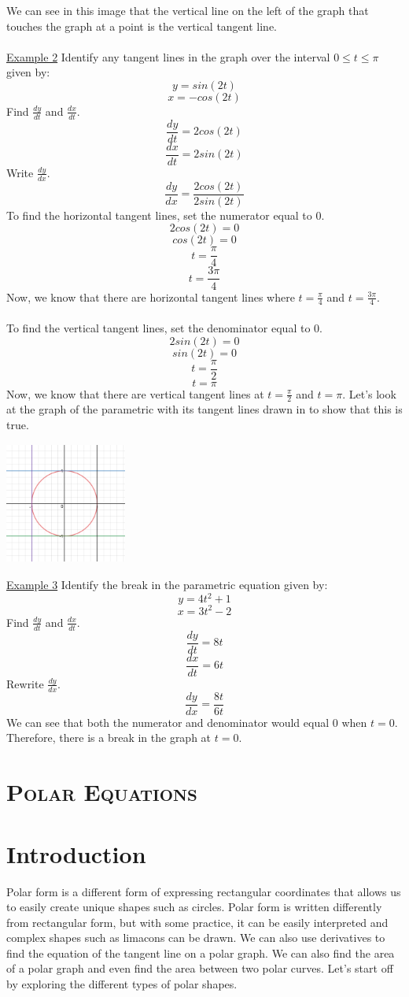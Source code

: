 \documentclass[a4paper,openright, 14pt]{article}
\newcommand{\ssection}[1]{%
\section[#1]{\centering\normalfont\scshape #1}}
\begin{document}
We can see in this image that the vertical line on the left of the graph that touches the graph at a point is the vertical tangent line.\\\\
\underline{Example 2}
Identify any tangent lines in the graph over the interval $0\leq t\leq \pi$ given by:
$$y=sin(2t)$$
$$x=-cos(2t)$$
Find $\frac{dy}{dt}$ and $\frac{dx}{dt}$.
$$\frac{dy}{dt}=2cos(2t)$$
$$\frac{dx}{dt}=2sin(2t)$$
Write $\frac{dy}{dx}$.
$$\frac{dy}{dx}=\frac{2cos(2t)}{2sin(2t)}$$
To find the horizontal tangent lines, set the numerator equal to 0. 
$$2cos(2t)=0$$
$$cos(2t)=0$$
$$t=\frac{\pi}{4}$$
$$t=\frac{3\pi}{4}$$
Now, we know that there are horizontal tangent lines where $t=\frac{\pi}{4}$ and $t=\frac{3\pi}{4}$.\\\\
To find the vertical tangent lines, set the denominator equal to 0.
$$2sin(2t)=0$$
$$sin(2t)=0$$
$$t=\frac{\pi}{2}$$
$$t=\pi$$
Now, we know that there are vertical tangent lines at $t=\frac{\pi}{2}$ and $t=\pi$. Let’s look at the graph of the parametric with its tangent lines drawn in to show that this is true.
\begin{center}
    \includegraphics[height=4cm, width=4cm]{Images/circletan.png}
\end{center}
\underline{Example 3}
Identify the break in the parametric equation given by:
$$y=4t^2+1$$
$$x=3t^2-2$$
Find $\frac{dy}{dt}$ and $\frac{dx}{dt}$.
$$\frac{dy}{dt}=8t$$
$$\frac{dx}{dt}=6t$$
Rewrite $\frac{dy}{dx}$.
$$\frac{dy}{dx}=\frac{8t}{6t}$$
We can see that both the numerator and denominator would equal 0 when $t=0$. Therefore, there is a break in the graph at $t=0$. 
\ssection{Polar Equations}
\section*{Introduction}
Polar form is a different form of expressing rectangular coordinates that allows us to easily create unique shapes such as circles. Polar form is written differently from rectangular form, but with some practice, it can be easily interpreted and complex shapes such as limacons can be drawn. We can also use derivatives to find the equation of the tangent line on a polar graph. We can also find the area of a polar graph and even find the area between two polar curves. Let’s start off by exploring the different types of polar shapes.
\end{document}
